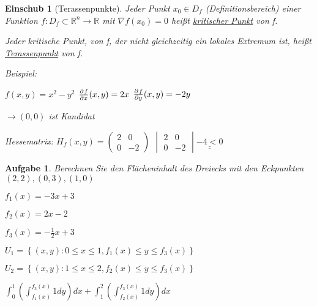 \documentclass[fontset=ubuntu,12pt,a4paper]{scrreprt}
\newtheorem{aufg}[defi]{Aufgabe}
\newtheorem*{einschub}{Einschub}
\begin{document}
    \begin{einschub}[Terassenpunkte]
        Jeder Punkt \(x_0\in D_f\) (Definitionsbereich) einer Funktion \(f:D_f\subset\mathbb{R}^n\to\mathbb{R}\) mit \(\nabla f(x_0)=0\) heißt \underline{kritischer Punkt} von f.

        Jeder kritische Punkt, von f, der nicht gleichzeitig ein lokales Extremum ist, heißt \underline{Terassenpunkt} von f.

        Beispiel:

        \(f(x,y)=x^2-y^2\)	\(\pd{f}{x}(x,y)=2x\)	\(\pd{f}{y}(x,y)=-2y\)

        \(\to (0,0)\) ist Kandidat

        Hessematrix: \(H_f(x,y)=\begin{pmatrix}2 & 0 \\ 0 & -2\end{pmatrix}\) \(\begin{vmatrix}2 & 0 \\ 0 & -2\end{vmatrix}\underline{\underline{-4<0}}\)

    \end{einschub}
    
    \begin{aufg}
        Berechnen Sie den Flächeninhalt des Dreiecks mit den Eckpunkten \((2,2),(0,3),(1,0)\)


        \(f_1(x) = -3x+3\)

        \(f_2(x) = 2x-2\)

        \(f_3(x) = -\frac{1}{2}x+3\)

        \(U_1=\left\{(x,y): 0 \le x \le 1, f_1(x) \le y \le f_3(x) \right\}\)

        \(U_2=\left\{(x,y): 1 \le x \le 2, f_2(x) \le y \le f_3(x) \right\}\)

        \(\int_0^1\left(\int_{f_1(x)}^{f_3(x)} 1dy\right)dx + \int_1^2\left(\int_{f_2(x)}^{f_3(x)} 1dy\right)dx\)
    \end{aufg}
\end{document}
